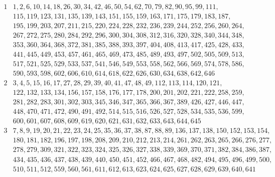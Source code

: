 \documentclass[final,onefignum,onetabnum]{siamart190516}
\begin{document}
\begin{table}[H]
\renewcommand{\arraystretch}{1.02}
\begin{small}
	\[
	\begin{array}{|*{2}{c|}}
		\hline
		1 & 1, 2, 6, 10, 14, 18, 26, 30, 34, 42, 46, 50, 54, 62, 70, 79, 82, 90, 95, 99, 111, \\
		& 115, 119, 123, 131, 135, 139, 143, 151, 155, 159, 163, 171, 175, 179, 183, 187, \\
		& 195, 199, 203, 207, 211, 215, 220, 224, 228, 232, 236, 239, 244, 252, 256, 260, 264, \\
		& 267, 272, 275, 280, 284, 292, 296, 300, 304, 308, 312, 316, 320, 328, 340, 344, 348, \\
		& 353, 360, 364, 368, 372, 381, 385, 388, 393, 397, 404, 408, 413, 417, 425, 428, 433, \\
		& 441, 445, 449, 453, 457, 461, 465, 469, 473, 485, 489, 493, 497, 502, 505, 509, 513, \\
		& 517, 521, 525, 529, 533, 537, 541, 546, 549, 553, 558, 562, 566, 569, 574, 578, 586, \\
		& 590, 593, 598, 602, 606, 610, 614, 618, 622, 626, 630, 634, 638, 642, 646 \\
		\hline
		2 & 3, 4, 5, 15, 16, 17, 27, 28, 29, 39, 40, 41, 47, 48, 49, 112, 113, 114, 120, 121, \\
		& 122, 132, 133, 134, 156, 157, 158, 176, 177, 178, 200, 201, 202, 221, 222, 258, 259, \\
		& 281, 282, 283, 301, 302, 303, 345, 346, 347, 365, 366, 367, 389, 426, 427, 446, 447, \\
		& 448, 470, 471, 472, 490, 491, 492, 514, 515, 516, 526, 527, 528, 534, 535, 536, 599, \\
		& 600, 601, 607, 608, 609, 619, 620, 621, 631, 632, 633, 643, 644, 645 \\
		\hline
		3 & 7, 8, 9, 19, 20, 21, 22, 23, 24, 25, 35, 36, 37, 38, 87, 88, 89, 136, 137, 138, 150, 152, 153, 154,\\
		& 180, 181, 182, 196, 197, 198, 208, 209, 210, 212, 213, 214, 261, 262, 263, 265, 266, 276, 277,\\
		& 278, 279, 309, 321, 322, 323, 324, 325, 326, 327, 338, 339, 369, 370, 371, 382, 384, 386, 387,\\
		& 434, 435, 436, 437, 438, 439, 440, 450, 451, 452, 466, 467, 468, 482, 494, 495, 496, 499, 500, \\
		& 510, 511, 512, 559, 560, 561, 611, 612, 613, 623, 624, 625, 627, 628, 629, 639, 640, 641\\

\end{array}\]
\end{small}
\end{table}
\end{document}
